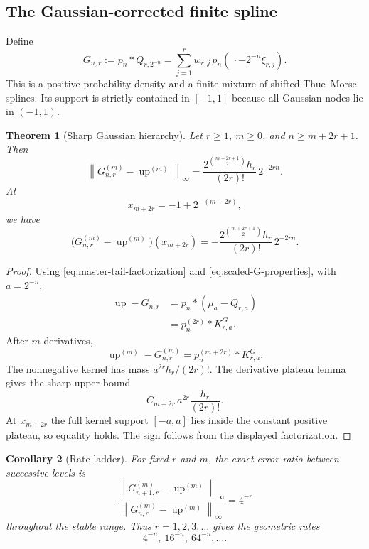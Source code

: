 \documentclass[11pt]{article}
\numberwithin{equation}{section}
\newtheorem{theorem}{Theorem}[section]
\newtheorem{corollary}[theorem]{Corollary}
\theoremstyle{definition}
\theoremstyle{remark}
\newcommand{\Up}{\operatorname{up}}
\newcommand{\norm}[1]{\left\lVert#1\right\rVert}
\begin{document}
\subsection{The Gaussian-corrected finite spline}

Define
\begin{equation}
 G_{n,r}:=p_n*Q_{r,2^{-n}}
 =\sum_{j=1}^{r}w_{r,j}\,p_n(\,\cdot-2^{-n}\xi_{r,j}).
 \label{eq:Gnr}
\end{equation}
This is a positive probability density and a finite mixture of shifted Thue--Morse splines.  Its support is strictly contained in $[-1,1]$ because all Gaussian nodes lie in $(-1,1)$.

\begin{theorem}[Sharp Gaussian hierarchy]
\label{thm:gaussian-exact}
Let $r\ge1$, $m\ge0$, and $n\ge m+2r+1$.  Then
\begin{equation}
 \boxed{
 \norm{G_{n,r}^{(m)}-\Up^{(m)}}_\infty
 =\frac{2^{\binom{m+2r+1}{2}}h_r}{(2r)!}\,2^{-2rn}.}
 \label{eq:Gaussian-exact}
\end{equation}
At
\begin{equation}
 x_{m+2r}=-1+2^{-(m+2r)},
 \label{eq:G-extremal}
\end{equation}
we have
\begin{equation}
 \boxed{
 \bigl(G_{n,r}^{(m)}-\Up^{(m)}\bigr)(x_{m+2r})
 =-\frac{2^{\binom{m+2r+1}{2}}h_r}{(2r)!}\,2^{-2rn}.}
 \label{eq:G-signed}
\end{equation}
\end{theorem}

\begin{proof}
Using \eqref{eq:master-tail-factorization} and \eqref{eq:scaled-G-properties}, with $a=2^{-n}$,
\begin{align}
 \Up-G_{n,r}
 &=p_n*(\mu_a-Q_{r,a})\nonumber\\
 &=p_n^{(2r)}*K_{r,a}^G.
 \label{eq:G-factorization}
\end{align}
After $m$ derivatives,
\[
 \Up^{(m)}-G_{n,r}^{(m)}
 =p_n^{(m+2r)}*K_{r,a}^G.
\]
The nonnegative kernel has mass $a^{2r}h_r/(2r)!$.  The derivative plateau lemma gives the sharp upper bound
\[
 C_{m+2r}\,a^{2r}\frac{h_r}{(2r)!}.
\]
At $x_{m+2r}$ the full kernel support $[-a,a]$ lies inside the constant positive plateau, so equality holds.  The sign follows from the displayed factorization.
\end{proof}

\begin{corollary}[Rate ladder]
For fixed $r$ and $m$, the exact error ratio between successive levels is
\begin{equation}
 \frac{\norm{G_{n+1,r}^{(m)}-\Up^{(m)}}_\infty}
 {\norm{G_{n,r}^{(m)}-\Up^{(m)}}_\infty}=4^{-r}
 \label{eq:Gaussian-ratio}
\end{equation}
throughout the stable range.  Thus $r=1,2,3,\ldots$ gives the geometric rates
\[
 4^{-n},\ 16^{-n},\ 64^{-n},\ldots.
\]
\end{corollary}
\end{document}
